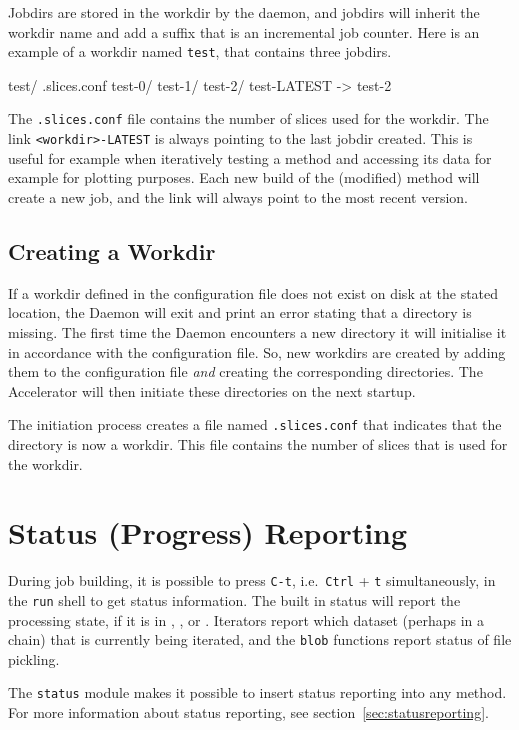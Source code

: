 Jobdirs are stored in the workdir by the daemon, and jobdirs will
inherit the workdir name and add a suffix that is an incremental job
counter.  Here is an example of a workdir named \texttt{test}, that
contains three jobdirs.
\begin{shell}
test/
    .slices.conf
    test-0/
    test-1/
    test-2/
    test-LATEST -> test-2
\end{shell}
The \texttt{.slices.conf} file contains the number of slices used for
the workdir.  The link \texttt{<workdir>-LATEST} is always pointing to
the last jobdir created.  This is useful for example when iteratively
testing a method and accessing its data for example for plotting
purposes.  Each new build of the (modified) method will create a new
job, and the link will always point to the most recent
version.


\subsection{Creating a Workdir}
If a workdir defined in the configuration file does not exist on disk
at the stated location, the Daemon will exit and print an error
stating that a directory is missing.  The first time the Daemon
encounters a new directory it will initialise it in accordance with
the configuration file.  So, new workdirs are created by adding them
to the configuration file \textsl{and} creating the corresponding
directories.  The Accelerator will then initiate these directories on
the next startup.

The initiation process creates a file named \texttt{.slices.conf} that
indicates that the directory is now a workdir.  This file contains the
number of slices that is used for the workdir.



\section{Status (Progress) Reporting}
During job building, it is possible to press \texttt{C-t},
i.e.\ \texttt{Ctrl} + \texttt{t} simultaneously, in the \texttt{run}
shell to get status information.  The built in status will report the
processing state, if it is in \prepare, \analysis, or \synthesis.
Iterators report which dataset (perhaps in a chain) that is currently
being iterated, and the \texttt{blob} functions report status of file
pickling.

The \texttt{status} module makes it possible to insert
status reporting into any method.  For more information about status
reporting, see section~\ref{sec:statusreporting}.



